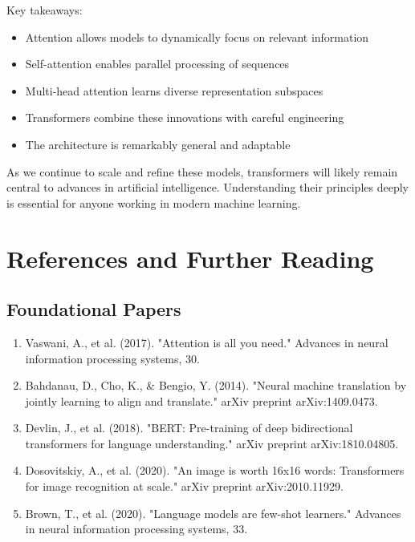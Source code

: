 \documentclass[11pt]{article}
\begin{document}
Key takeaways:
\begin{itemize}
    \item Attention allows models to dynamically focus on relevant information
    \item Self-attention enables parallel processing of sequences
    \item Multi-head attention learns diverse representation subspaces
    \item Transformers combine these innovations with careful engineering
    \item The architecture is remarkably general and adaptable
\end{itemize}

As we continue to scale and refine these models, transformers will likely remain central to advances in artificial intelligence. Understanding their principles deeply is essential for anyone working in modern machine learning.

\section{References and Further Reading}

\subsection{Foundational Papers}

\begin{enumerate}
    \item Vaswani, A., et al. (2017). "Attention is all you need." Advances in neural information processing systems, 30.
    
    \item Bahdanau, D., Cho, K., \& Bengio, Y. (2014). "Neural machine translation by jointly learning to align and translate." arXiv preprint arXiv:1409.0473.
    
    \item Devlin, J., et al. (2018). "BERT: Pre-training of deep bidirectional transformers for language understanding." arXiv preprint arXiv:1810.04805.
    
    \item Dosovitskiy, A., et al. (2020). "An image is worth 16x16 words: Transformers for image recognition at scale." arXiv preprint arXiv:2010.11929.
    
    \item Brown, T., et al. (2020). "Language models are few-shot learners." Advances in neural information processing systems, 33.
\end{enumerate}
\end{document}

